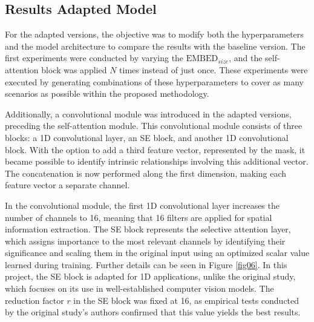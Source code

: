 \documentclass[journal,twoside,web]{ieeecolor}
\begin{document}
\subsection{Results Adapted Model}

For the adapted versions, the objective was to modify both the hyperparameters and the model architecture to compare the results with the baseline version. The first experiments were conducted by varying the $\text{EMBED}_{size}$, and the self-attention block was applied $N$ times instead of just once. These experiments were executed by generating combinations of these hyperparameters to cover as many scenarios as possible within the proposed methodology.  

Additionally, a convolutional module was introduced in the adapted versions, preceding the self-attention module. This convolutional module consists of three blocks: a 1D convolutional layer, an \gls{SE} block, and another 1D convolutional block. With the option to add a third feature vector, represented by the mask, it became possible to identify intrinsic relationships involving this additional vector. The concatenation is now performed along the first dimension, making each feature vector a separate channel.  

In the convolutional module, the first 1D convolutional layer increases the number of channels to 16, meaning that 16 filters are applied for spatial information extraction. The \gls{SE} block represents the selective attention layer, which assigns importance to the most relevant channels by identifying their significance and scaling them in the original input using an optimized scalar value learned during training. Further details can be seen in Figure \ref{fig06}. In this project, the \gls{SE} block is adapted for 1D applications, unlike the original study, which focuses on its use in well-established computer vision models. The reduction factor $r$ in the \gls{SE} block was fixed at 16, as empirical tests conducted by the original study's authors confirmed that this value yields the best results.
\end{document}

